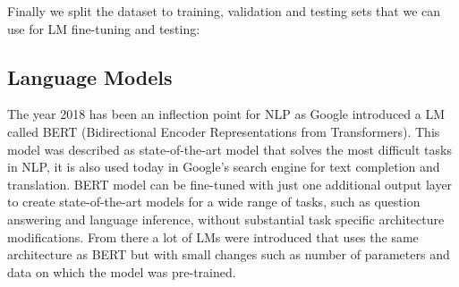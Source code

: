 \documentclass[conference]{IEEEtran}
\begin{document}
\begin{table}[htp]
\centering
{}
\vspace{0.4cm}
\caption{Examples of FEVER claims and labels.}
\label{tab:fever_example}
\end{table}

Finally we split the dataset to training, validation and testing sets that we can use for LM fine-tuning and testing:

\begin{table}[htp]
\centering
{}
\vspace{0.4cm}
\caption{Dataset split sizes for SUPPORTS, REFUTES and NOTENOUGHINFO (NEI) classes.}
\label{tab:fever_splits}
\end{table}

\subsection{Language Models}
The year 2018 has been an inflection point for NLP as Google introduced a LM called BERT (Bidirectional Encoder Representations from Transformers)\cite{devlin2018bert}. This model was described as state-of-the-art model that solves the most difficult tasks in NLP, it is also used today in Google's search engine for text completion and translation. BERT model can be fine-tuned with just one additional output layer to create state-of-the-art models for a wide range of tasks, such as question answering and language inference, without substantial task specific architecture modifications. From there a lot of LMs were introduced that uses the same architecture as BERT but with small changes such as number of parameters and data on which the model was pre-trained.
\end{document}
